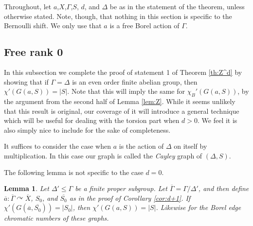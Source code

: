 \documentclass[10pt,a4paper]{article}
\newcommand{\0}{\varnothing}
\newtheorem{lemma}{Lemma}
\begin{document}
Throughout, let $a$,$X$,$\Gamma$,$S$, $d$, and $\Delta$ be as in the statement of the theorem, unless otherwise stated. Note, though, that nothing in this section is specific to the Bernoulli shift. We only use that $a$ is a free Borel action of $\Gamma$.

\subsection{Free rank 0}

In this subsection we complete the proof of statement 1 of Theorem \ref{th:Z^d} by showing that if $\Gamma = \Delta$ is an even order finite abelian group, then $\chi'(G(a,S)) = |S|$. Note that this will imply the same for $\chi_B'(G(a,S))$, by the argument from the second half of Lemma \ref{lem:Z}. While it seems unlikely that this result is original, our coverage of it will introduce a general technique which will be useful for dealing with the torsion part when $d > 0$. We feel it is also simply nice to include for the sake of completeness. 

It suffices to consider the case when $a$ is the action of $\Delta$ on itself by multiplication. In this case our graph is called the \textit{Cayley} graph of $(\Delta,S)$. 

The following lemma is not specific to the case $d=0$.

\begin{lemma}\label{lem:quotient}
Let $\Delta' \leq \Gamma$ be a finite proper subgroup. Let $\overline{\Gamma} = \Gamma/\Delta'$, and then define $\overline{a}:\overline{\Gamma} \curvearrowright \overline{X}$, $S_0$, and $\overline{S_0}$ as in the proof of Corollary \ref{cor:d+1}. If $\chi'(G(\overline{a},\overline{S_0})) = |{S_0}|$, then $\chi'(G(a,S)) = |S|$. Likewise for the Borel edge chromatic numbers of these graphs.
\end{lemma}
\end{document}
